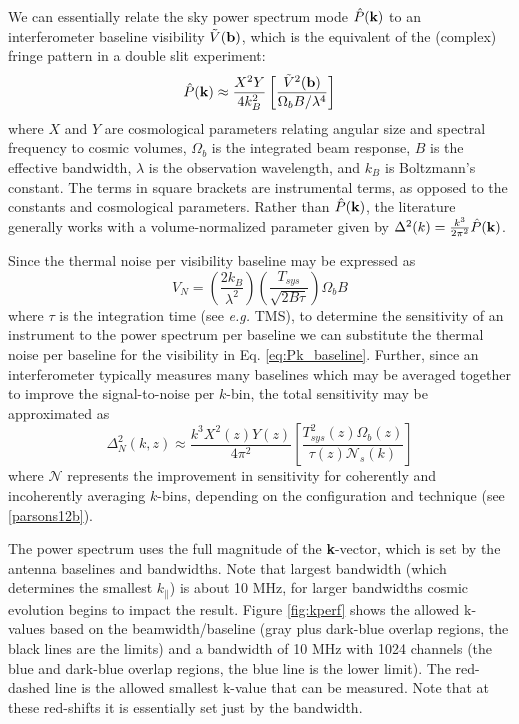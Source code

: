 \documentclass{article}
\newcommand{\kvec}{{\bf k}}
\newcommand{\bvec}{{\bf b}}
\newcommand{\kpar}{{k_\parallel}}
\begin{document}
We can essentially relate the sky power spectrum mode ${\hat P}(\kvec)$ to an interferometer baseline visibility ${\tilde V}(\bvec)$, which is the equivalent of the (complex) fringe pattern in a double slit experiment:
\begin{equation}
{\hat P}(\kvec) \approx\frac{X^2Y}{4k_B^2}   \left[\frac{{\tilde V}^2(\bvec)}{\Omega_b B/ \lambda^4} \right]
\label{eq:Pk_baseline}
\end{equation}
where $X$ and $Y$ are cosmological parameters relating angular size and spectral frequency to cosmic volumes, $\Omega_b$ is the integrated beam response, $B$ is the effective bandwidth, $\lambda$ is the observation wavelength, and $k_B$ is Boltzmann's constant.  The terms in square brackets are instrumental terms, as opposed to the constants and cosmological parameters.  Rather than ${\hat P}(\kvec)$, the literature generally works with a volume-normalized parameter given by $\Delta^2(k) = \frac{k^3}{2\pi^2}{\hat P}(\kvec)$.

Since the thermal noise per visibility baseline may be expressed as
\begin{equation}
V_N = \left(\frac{2k_B}{\lambda^2}\right)\left(\frac{T_{sys}}{\sqrt{2B\tau}}\right)\Omega_b B
\label{eq:sensitivity_per_baseline}
\end{equation}
where $\tau$ is the integration time (see {\em e.g.} TMS),
to determine the sensitivity of an instrument to the power spectrum per baseline we can substitute the thermal noise per baseline for the visibility in Eq. \ref{eq:Pk_baseline}.  Further, since an interferometer typically measures many baselines which may be averaged together to improve the signal-to-noise per $k$-bin, the total sensitivity may be approximated as
\begin{equation}
\Delta^2_N (k,z)\approx \frac{k^3X^2(z)Y(z)}{4\pi^2} \left[\frac{T_{sys}^2(z)\Omega_b(z) }{\tau(z) \mathcal{N}_s(k)}\right]
\end{equation}
where $\mathcal{N}$ represents the improvement in sensitivity for coherently and incoherently averaging $k$-bins, depending on the configuration and technique (see \ref{parsons12b}).

The power spectrum uses the full magnitude of the {\bf k}-vector, which is set by the antenna baselines and bandwidths.  Note that largest bandwidth (which determines the smallest $\kpar$) is about 10 MHz, for larger bandwidths cosmic evolution begins to impact the result.  Figure \ref{fig:kperf} shows the allowed k-values based on the beamwidth/baseline (gray plus dark-blue overlap regions, the black lines are the limits) and a bandwidth of 10 MHz with 1024 channels (the blue and dark-blue overlap regions, the blue line is the lower limit).  The red-dashed line is the allowed smallest k-value that can be measured.  Note that at these red-shifts it is essentially set just by the bandwidth.
\end{document}
